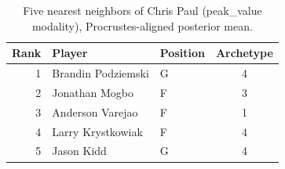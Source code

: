 \begin{table}[htbp]
  \centering\small
  \begin{tabular}{rllc}
    \toprule
    Rank & Player & Position & Archetype \\
    \midrule
    1 & Brandin Podziemski & G & 4 \\
    2 & Jonathan Mogbo & F & 3 \\
    3 & Anderson Varejao & F & 1 \\
    4 & Larry Krystkowiak & F & 4 \\
    5 & Jason Kidd & G & 4 \\
    \bottomrule
  \end{tabular}
  \caption{Five nearest neighbors of Chris Paul (peak_value modality), Procrustes-aligned posterior mean.}
  \label{tab:Chris_Paul_neighbors_peak_value}
\end{table}

